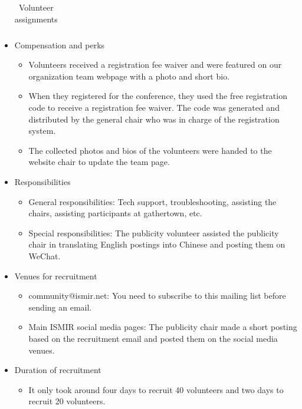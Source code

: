 \documentclass[%
10pt,								%
titlepage,						%
]
{scrartcl}
\begin{document}
\begin{itemize}
\begin{table}
\begin{tabular}{l|l|l|l|l}
                    \end{tabular}
                    \caption{Volunteer assignments}
                    \label{tab:volunteers}
                \end{table}
            \item   Compensation and perks
                \begin{itemize}
                    \item   Volunteers received a registration fee waiver and were featured on our organization team webpage with a photo and short bio.
                    \item   When they registered for the conference, they used the free registration code to receive a registration fee waiver. The code was generated and distributed by the general chair who was in charge of the registration system.
                    \item   The collected photos and bios of the volunteers were handed to the website chair to update the team page. 
                \end{itemize}
            \item   Responsibilities
                \begin{itemize}
                    \item   General responsibilities: Tech support, troubleshooting, assisting the chairs, assisting participants at gathertown, etc. 
                    \item   Special responsibilities: The publicity volunteer assisted the publicity chair in translating English postings into Chinese and posting them on WeChat.
                \end{itemize}
            \item   Venues for recruitment
                \begin{itemize}
                    \item   community@ismir.net: You need to subscribe to this mailing list before sending an email.
                    \item   Main ISMIR social media pages: The publicity chair made a short posting based on the recruitment email and posted them on the social media venues. 
                \end{itemize}
            \item   Duration of recruitment
                \begin{itemize}
                    \item   It only took around four days to recruit 40 volunteers and two days to recruit 20 volunteers.

\end{itemize}
\end{itemize}
\end{document}
